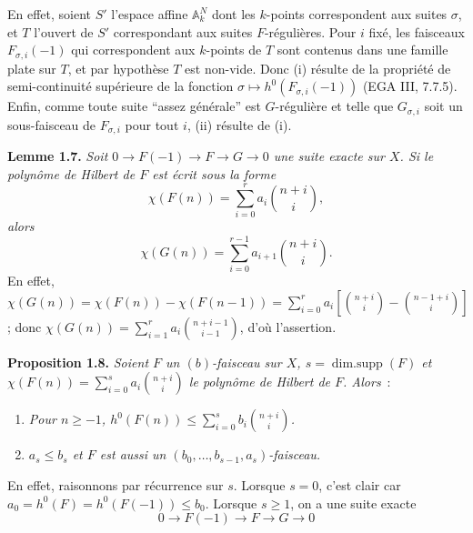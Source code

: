 
En
effet, soient \(S'\) l'espace affine \(\mathbb A_k^N\) dont les \(k\)-points correspondent aux suites \(\sigma\), et \(T\) l'ouvert de \(S'\) correspondant aux suites \(F\)-régulières. Pour \(i\) fixé, les faisceaux \(F_{\sigma,i}(-1)\) qui correspondent aux \(k\)-points de \(T\) sont contenus dans une famille plate sur \(T\), et par hypothèse \(T\) est non-vide. Donc (i) résulte de la propriété de semi-continuité supérieure de la fonction $\sigma\longmapsto h^0(F_{\sigma,i}(-1))$ (EGA III, 7.7.5). Enfin, comme toute suite ``assez générale'' est \(G\)-régulière et telle que \(G_{\sigma,i}\) soit un sous-faisceau de \(F_{\sigma,i}\) pour tout \(i\), (ii) résulte de (i).

\textbf{Lemme 1.7.} \emph{Soit \(0\to F(-1)\to F\to G\to0\) une suite exacte sur \(X\). Si le polynôme de Hilbert de \(F\) est écrit sous la forme}
\[
 \chi(F(n))=\sum_{i=0}^{r}a_i\binom{n+i}{i},
\]
\emph{alors}
\[
 \chi(G(n))=\sum_{i=0}^{r-1}a_{i+1}\binom{n+i}{i}.
\]
En effet, \(\chi(G(n))=\chi(F(n))-\chi(F(n-1))=\sum_{i=0}^{r}a_i\left[\binom{n+i}{i}-\binom{n-1+i}{i}\right]\); donc \(\chi(G(n))=\sum_{i=1}^{r}a_i\binom{n+i-1}{i-1}\), d'où l'assertion.

\textbf{Proposition 1.8.} \emph{Soient \(F\) un \((b)\)-faisceau sur \(X\), \(s=\operatorname{dim{.}supp}(F)\) et \(\chi(F(n))=\sum_{i=0}^{s}a_i\binom{n+i}{i}\) le polynôme de Hilbert de \(F\). Alors}~:
\begin{enumerate}[label=(\roman*)]
\item \emph{Pour \(n\ge -1\), \(h^0(F(n))\le \sum_{i=0}^{s}b_i\binom{n+i}{i}\).}
\item \emph{\(a_s\le b_s\) et \(F\) est aussi un \((b_0,\ldots,b_{s-1},a_s)\)-faisceau.}
\end{enumerate}
En effet, raisonnons par récurrence sur \(s\). Lorsque \(s=0\), c'est clair car \(a_0=h^0(F)=h^0(F(-1))\le b_0\). Lorsque \(s\ge1\), on a une suite exacte
\[
0\longrightarrow F(-1)\longrightarrow F\longrightarrow G\longrightarrow0
\]
